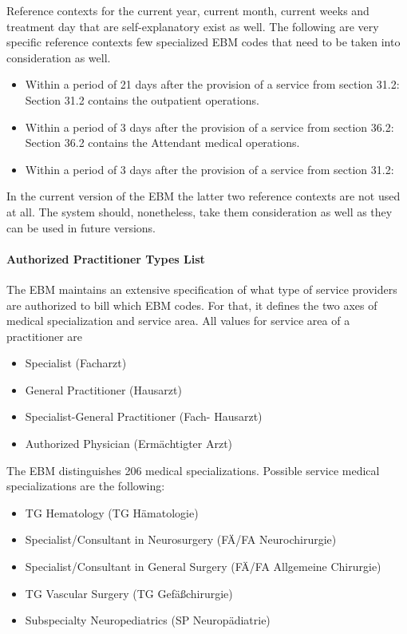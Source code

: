 Reference contexts for the current year, current month, current weeks and treatment day that are self-explanatory exist as well.
The following are very specific reference contexts few specialized EBM codes that need to be taken into consideration as well.
\begin{itemize}
    \item Within a period of 21 days after the provision of a service from section 31.2:
    Section 31.2 contains the \glqq outpatient operations\glqq.
    \item Within a period of 3 days after the provision of a service from section 36.2:
    Section 36.2 contains the \glqq Attendant medical operations\glqq.
    \item Within a period of 3 days after the provision of a service from section 31.2:
\end{itemize}
In the current version of the EBM the latter two reference contexts are not used at all.
The system should, nonetheless, take them consideration as well as they can be used in future versions.


\paragraph{Authorized Practitioner Types List}\label{par:authorized-practitioner-types-list}
The EBM maintains an extensive specification of what type of service providers are authorized to bill which EBM codes.
For that, it defines the two axes of medical specialization and service area.
All values for service area of a practitioner are
\begin{itemize}
    \item Specialist (Facharzt)
    \item General Practitioner (Hausarzt)
    \item Specialist-General Practitioner (Fach- Hausarzt)
    \item Authorized Physician (Ermächtigter Arzt)
\end{itemize}

The EBM distinguishes 206 medical specializations.
Possible service medical specializations are the following:
\begin{itemize}
    \item TG Hematology (TG Hämatologie)
    \item Specialist/Consultant in Neurosurgery (FÄ/FA Neurochirurgie)
    \item Specialist/Consultant in General Surgery (FÄ/FA Allgemeine Chirurgie)
    \item TG Vascular Surgery (TG Gefäßchirurgie)
    \item Subspecialty Neuropediatrics (SP Neuropädiatrie)
\end{itemize}

